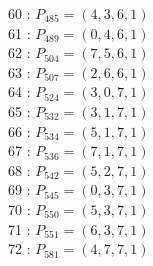 \documentclass{article}
\begin{document}
{\begin{multicols}{3}
60 : $P_{485}=( 4, 3, 6, 1 )$\\
61 : $P_{489}=( 0, 4, 6, 1 )$\\
62 : $P_{504}=( 7, 5, 6, 1 )$\\
63 : $P_{507}=( 2, 6, 6, 1 )$\\
64 : $P_{524}=( 3, 0, 7, 1 )$\\
65 : $P_{532}=( 3, 1, 7, 1 )$\\
66 : $P_{534}=( 5, 1, 7, 1 )$\\
67 : $P_{536}=( 7, 1, 7, 1 )$\\
68 : $P_{542}=( 5, 2, 7, 1 )$\\
69 : $P_{545}=( 0, 3, 7, 1 )$\\
70 : $P_{550}=( 5, 3, 7, 1 )$\\
71 : $P_{551}=( 6, 3, 7, 1 )$\\
72 : $P_{581}=( 4, 7, 7, 1 )$\\
\end{multicols}


%


%


}%
\end{document}
